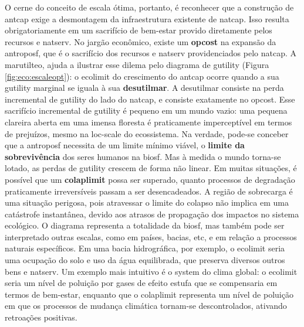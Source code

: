 \documentclass[./main.tex]{subfiles}
\begin{document}
\par O cerne do conceito de escala ótima, portanto, é reconhecer que a construção de \gls{antcap} exige a desmontagem da infraestrutura existente de \gls{natcap}. Isso resulta obrigatoriamente em um sacrifício de bem-estar provido diretamente pelos recursos e \gls{natserv}. No jargão econômico, existe um \textbf{\gls{opcost}} na expansão da \gls{antroposf}, que é o sacrifício dos recursos e \gls{natserv} providenciados pelo \gls{natcap}. A \gls{marutilteo}, ajuda a ilustrar esse dilema pelo diagrama de \gls{gutility} (Figura \ref{fig:eco:escaleopt}): o \gls{ecolimit} do crescimento do \gls{antcap} ocorre quando a sua \gls{gutility} marginal se iguala à sua \textbf{\gls{desutilmar}}. A \gls{desutilmar} consiste na perda incremental de \gls{gutility} do lado do \gls{natcap}, e consiste exatamente no \gls{opcost}. Esse sacrifício incremental de \gls{gutility} é pequeno em um mundo vazio: uma pequena clareira aberta em uma imensa floresta é praticamente imperceptível em termos de prejuízos, mesmo na \gls{loc-scale} do ecossistema. Na verdade, pode-se conceber que a \gls{antroposf} necessita de um limite mínimo viável, o \textbf{limite da sobrevivência} dos seres humanos na \gls{biosf}. Mas à medida o mundo torna-se lotado, as perdas de \gls{gutility} crescem de forma não linear. Em muitas situações, é possível que um \textbf{\gls{colaplimit}} possa ser superado, quanto processos de degradação praticamente irreversíveis passam a ser desencadeados. A região de sobrecarga é uma situação perigosa, pois atravessar o limite do colapso não implica em uma catástrofe instantânea, devido aos atrasos de propagação dos impactos no sistema ecológico. O diagrama representa a totalidade da \gls{biosf}, mas também pode ser interpretado outras escalas, como em países, bacias, etc, e em relação a processos naturais específicos. Em uma bacia hidrográfica, por exemplo, o \gls{ecolimit} seria uma ocupação do solo e uso da água equilibrada, que preserva diversos outros bens e \gls{natserv}. Um exemplo mais intuitivo é o \gls{system} do clima global: o \gls{ecolimit} seria um nível de poluição por gases de efeito estufa que se compensaria em termos de bem-estar, enquanto que o \gls{colaplimit} representa um nível de poluição em que os processos de mudança climática tornam-se descontrolados, ativando retroações positivas. 
\end{document}
